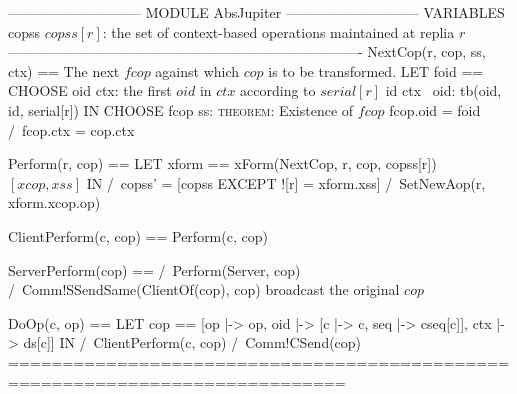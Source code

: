 \documentclass{article}
\begin{document}
\begin{tla}
----------------------------- MODULE AbsJupiter -----------------------------
VARIABLES
    copss   \* $copss[r]$: the set of context-based operations maintained at replia $r$
----------------------------------------------------------------------------
NextCop(r, cop, ss, ctx) == \* The next $fcop$ against which $cop$ is to be transformed.
    LET foid == CHOOSE oid \in ctx: \* the first $oid$ in $ctx$ according to $serial[r]$
                    \A id \in ctx \ {oid}: tb(oid, id, serial[r])
    IN  CHOOSE fcop \in ss: \* \textsc{theorem}: Existence of $fcop$
            fcop.oid = foid /\ fcop.ctx = cop.ctx 

Perform(r, cop) ==
    LET xform == xForm(NextCop, r, cop, copss[r])  \* $[xcop, xss]$
    IN  /\ copss' = [copss EXCEPT ![r] = xform.xss]
        /\ SetNewAop(r, xform.xcop.op)
        
ClientPerform(c, cop) == Perform(c, cop)
        
ServerPerform(cop) == 
    /\ Perform(Server, cop)
    /\ Comm!SSendSame(ClientOf(cop), cop) \* broadcast the original $cop$

DoOp(c, op) ==
    LET cop == [op |-> op, oid |-> [c |-> c, seq |-> cseq[c]], ctx |-> ds[c]]
    IN  /\ ClientPerform(c, cop)
        /\ Comm!CSend(cop) 
=============================================================================
\end{tla}
\end{document}
